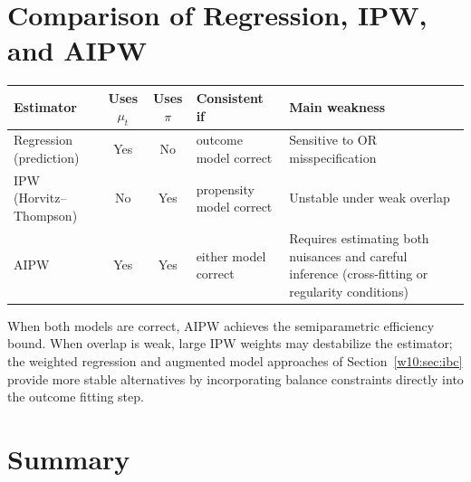 \documentclass[master.tex]{subfiles}
\begin{document}
\section{Comparison of Regression, IPW, and AIPW}
\label{w10:sec:comparison}

\begin{center}
\renewcommand{\arraystretch}{1.3}
\begin{tabular}{lcclp{4.8cm}}
\hline
Estimator & Uses $\mu_t$ & Uses $\pi$ & Consistent if & Main weakness \\
\hline
Regression (prediction) & Yes & No  & outcome model correct
  & Sensitive to OR misspecification \\
IPW (Horvitz--Thompson) & No  & Yes & propensity model correct
  & Unstable under weak overlap \\
AIPW                    & Yes & Yes & either model correct
  & Requires estimating both nuisances and careful inference (cross-fitting or regularity conditions) \\
\hline
\end{tabular}
\end{center}

\begin{remark}
\label{w10:rem:both-correct}
When both models are correct, AIPW achieves the semiparametric
efficiency bound.  When overlap is weak, large IPW weights may
destabilize the estimator; the weighted regression and augmented
model approaches of Section~\ref{w10:sec:ibc} provide more stable
alternatives by incorporating balance constraints directly into the
outcome fitting step.
\end{remark}

\section{Summary}
\label{w10:sec:summary}
\end{document}
